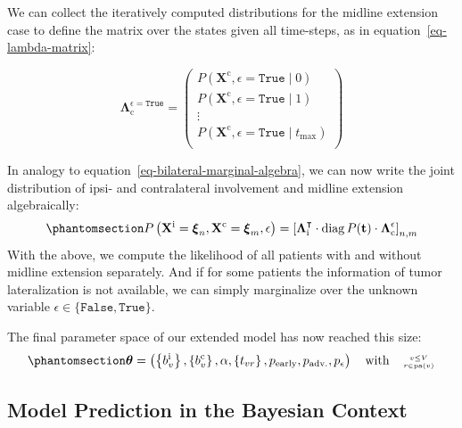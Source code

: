 \documentclass[
  sn-mathphys-num,
]{sn-jnl}
\begin{document}
We can collect the iteratively computed distributions for the midline
extension case to define the matrix over the states given all
time-steps, as in equation~\ref{eq-lambda-matrix}:

\[
\boldsymbol{\Lambda}_\text{c}^{\epsilon=\texttt{True}} = \begin{pmatrix}
P \left( \mathbf{X}^\text{c}, \epsilon=\texttt{True} \mid 0 \right) \\
P \left( \mathbf{X}^\text{c}, \epsilon=\texttt{True} \mid 1 \right) \\
\vdots \\
P \left( \mathbf{X}^\text{c}, \epsilon=\texttt{True} \mid t_\text{max} \right) \\
\end{pmatrix}
\]

In analogy to equation~\ref{eq-bilateral-marginal-algebra}, we can now
write the joint distribution of ipsi- and contralateral involvement and
midline extension algebraically:
%
\begin{equation}\phantomsection\label{eq-midline-marginal-algebra}{
P \left( \mathbf{X}^\text{i} = \boldsymbol{\xi}_n, \mathbf{X}^\text{c} = \boldsymbol{\xi}_m, \epsilon \right) = \left[ \boldsymbol{\Lambda}^\intercal_\text{i} \cdot \operatorname{diag} P(\mathbf{t}) \cdot \boldsymbol{\Lambda}_\text{c}^\epsilon \right]_{n,m}
}\end{equation}
%
With the above, we compute the likelihood of all patients with and
without midline extension separately. And if for some patients the
information of tumor lateralization is not available, we can simply
marginalize over the unknown variable
\(\epsilon \in \{ \texttt{False}, \texttt{True} \}\).

The final parameter space of our extended model has now reached this
size:
%
\begin{equation}\phantomsection\label{eq-ext-param-space}{
\boldsymbol{\theta} = \left( \left\{ b_v^\text{i} \right\}, \left\{ b_v^\text{c} \right\}, \alpha, \left\{ t_{vr} \right\}, p_\text{early}, p_\text{adv.}, p_\epsilon \right) \quad \text{with} \quad \genfrac{}{}{0pt}{2}{v\leq V}{r\in\operatorname{pa}(v)}
}\end{equation}

\subsection{Model Prediction in the Bayesian
Context}\label{model-prediction-in-the-bayesian-context}
\end{document}
